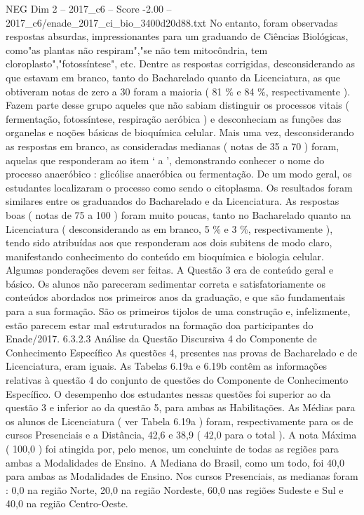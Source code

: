 \begin{textsample}{NEG Dim 2 – 2017\_c6 – Score -2.00 – 2017\_c6/enade\_2017\_ci\_bio\_3400d20d88.txt}
No entanto, foram observadas respostas absurdas, impressionantes para um graduando de Ciências Biológicas, como"as plantas não respiram","se não tem mitocôndria, tem cloroplasto","fotossíntese", etc.
Dentre as respostas corrigidas, desconsiderando as que estavam em branco, tanto do Bacharelado quanto da Licenciatura, as que obtiveram notas de zero a 30 foram a maioria ( 81 \% e 84 \%, respectivamente ).
Fazem parte desse grupo aqueles que não sabiam distinguir os processos vitais ( fermentação, fotossíntese, respiração aeróbica ) e desconheciam as funções das organelas e noções básicas de bioquímica celular.
Mais uma vez, desconsiderando as respostas em branco, as consideradas medianas ( notas de 35 a 70 ) foram, aquelas que responderam ao item ‘ a ’, demonstrando conhecer o nome do processo anaeróbico : glicólise anaeróbica ou fermentação.
De um modo geral, os estudantes localizaram o processo como sendo o citoplasma.
Os resultados foram similares entre os graduandos do Bacharelado e da Licenciatura.
As respostas boas ( notas de 75 a 100 ) foram muito poucas, tanto no Bacharelado quanto na Licenciatura ( desconsiderando as em branco, 5 \% e 3 \%, respectivamente ), tendo sido atribuídas aos que responderam aos dois subitens de modo claro, manifestando conhecimento do conteúdo em bioquímica e biologia celular.
Algumas ponderações devem ser feitas.
A Questão 3 era de conteúdo geral e básico.
Os alunos não pareceram sedimentar correta e satisfatoriamente os conteúdos abordados nos primeiros anos da graduação, e que são fundamentais para a sua formação.
São os primeiros tijolos de uma construção e, infelizmente, estão parecem estar mal estruturados na formação doa participantes do Enade/2017. 6.3.2.3 Análise da Questão Discursiva 4 do Componente de Conhecimento Específico As questões 4, presentes nas provas de Bacharelado e de Licenciatura, eram iguais.
As Tabelas 6.19a e 6.19b contêm as informações relativas à questão 4 do conjunto de questões do Componente de Conhecimento Específico.
O desempenho dos estudantes nessas questões foi superior ao da questão 3 e inferior ao da questão 5, para ambas as Habilitações.
As Médias para os alunos de Licenciatura ( ver Tabela 6.19a ) foram, respectivamente para os de cursos Presenciais e a Distância, 42,6 e 38,9 ( 42,0 para o total ).
A nota Máxima ( 100,0 ) foi atingida por, pelo menos, um concluinte de todas as regiões para ambas a Modalidades de Ensino.
A Mediana do Brasil, como um todo, foi 40,0 para ambas as Modalidades de Ensino.
Nos cursos Presenciais, as medianas foram : 0,0 na região Norte, 20,0 na região Nordeste, 60,0 nas regiões Sudeste e Sul e 40,0 na região Centro-Oeste.

\end{textsample}
